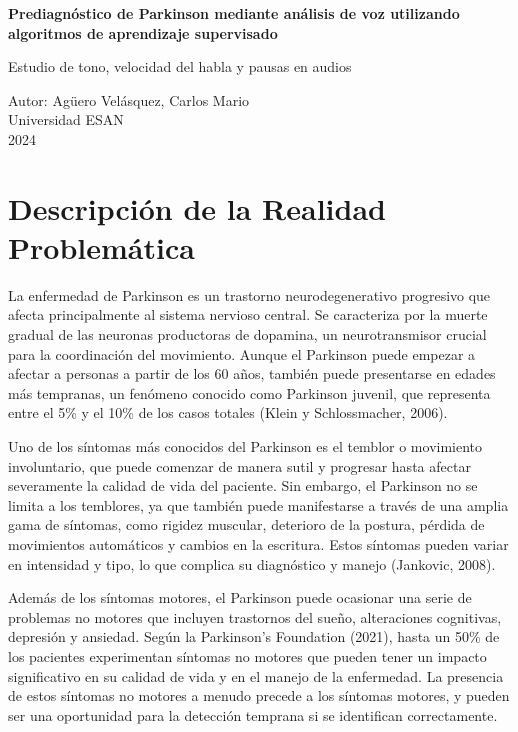 \documentclass[a4paper,12pt]{article}
\begin{document}
\begin{titlepage}
    \centering
    \vspace*{2cm}

    \Huge
    \textbf{Prediagnóstico de Parkinson mediante análisis de voz utilizando algoritmos de aprendizaje supervisado}

    \vspace{1.5cm}

    \Large
    Estudio de tono, velocidad del habla y pausas en audios

    \vfill

    \Large
    Autor: Agüero Velásquez, Carlos Mario \\
    Universidad ESAN\\
    2024

    \vspace{0.8cm}


\end{titlepage}

\section*{Descripción de la Realidad Problemática}

La enfermedad de Parkinson es un trastorno neurodegenerativo progresivo que afecta principalmente al sistema nervioso central. Se caracteriza por la muerte gradual de las neuronas productoras de dopamina, un neurotransmisor crucial para la coordinación del movimiento. Aunque el Parkinson puede empezar a afectar a personas a partir de los 60 años, también puede presentarse en edades más tempranas, un fenómeno conocido como Parkinson juvenil, que representa entre el 5\% y el 10\% de los casos totales (Klein y Schlossmacher, 2006).

Uno de los síntomas más conocidos del Parkinson es el temblor o movimiento involuntario, que puede comenzar de manera sutil y progresar hasta afectar severamente la calidad de vida del paciente. Sin embargo, el Parkinson no se limita a los temblores, ya que también puede manifestarse a través de una amplia gama de síntomas, como rigidez muscular, deterioro de la postura, pérdida de movimientos automáticos y cambios en la escritura. Estos síntomas pueden variar en intensidad y tipo, lo que complica su diagnóstico y manejo (Jankovic, 2008).

Además de los síntomas motores, el Parkinson puede ocasionar una serie de problemas no motores que incluyen trastornos del sueño, alteraciones cognitivas, depresión y ansiedad. Según la Parkinson's Foundation (2021), hasta un 50\% de los pacientes experimentan síntomas no motores que pueden tener un impacto significativo en su calidad de vida y en el manejo de la enfermedad. La presencia de estos síntomas no motores a menudo precede a los síntomas motores, y pueden ser una oportunidad para la detección temprana si se identifican correctamente.
\end{document}
